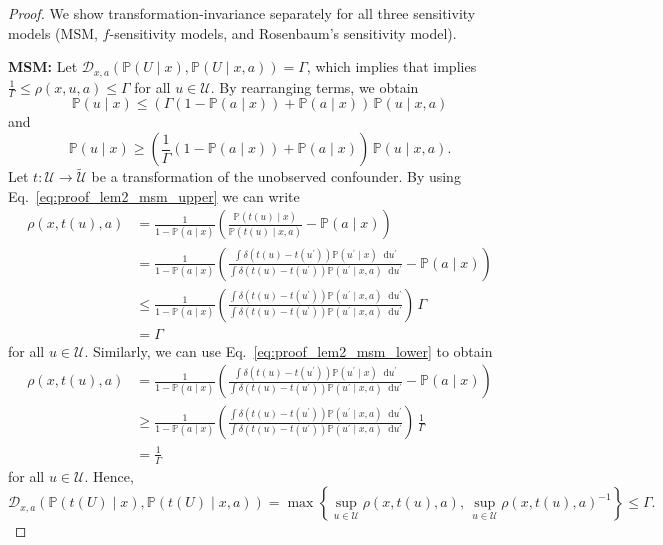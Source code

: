 \documentclass{article} %
\newcommand*\diff{\mathop{}\!\mathrm{d}}
\theoremstyle{definition}
\theoremstyle{plain}
\begin{document}
\begin{proof}
We show transformation-invariance separately for all three sensitivity models (MSM, $f$-sensitivity models, and Rosenbaum's sensitivity model).

\textbf{MSM:} Let $\mathcal{D}_{x, a}(\mathbb{P}(U \mid x), \mathbb{P}(U \mid x, a)) = \Gamma$, which implies that implies $\frac{1}{\Gamma} \leq \rho(x, u, a) \leq \Gamma$ for all $u \in \mathcal{U}$. By rearranging terms, we obtain
\begin{equation}\label{eq:proof_lem2_msm_upper}
\mathbb{P}(u \mid x)  \leq \left( \Gamma (1 - \mathbb{P}(a \mid x)) + \mathbb{P}(a \mid x) \right) \, \mathbb{P}(u \mid x, a)
\end{equation}
and
\begin{equation}\label{eq:proof_lem2_msm_lower}
\mathbb{P}(u \mid x)  \geq \left( \frac{1}{\Gamma} (1 - \mathbb{P}(a \mid x)) + \mathbb{P}(a \mid x) \right) \, \mathbb{P}(u \mid x, a).
\end{equation}
Let $t \colon \mathcal{U} \to \widetilde{\mathcal{U}}$ be a transformation of the unobserved confounder. By using Eq.~\eqref{eq:proof_lem2_msm_upper} we can write
\begin{align}
\rho(x, t(u), a) &=\frac{1}{1 - \mathbb{P}(a \mid x)} \left(\frac{\mathbb{P}(t(u) \mid x)}{\mathbb{P}(t(u) \mid x, a)} - \mathbb{P}(a \mid x) \right) \\
&= \frac{1}{1 - \mathbb{P}(a \mid x)} \left(\frac{ \int \delta(t(u) - t(u^\prime))\mathbb{P}(u^\prime \mid x) \diff u^\prime}{\int \delta(t(u) - t(u^\prime))\mathbb{P}(u^\prime \mid x, a) \diff u^\prime} - \mathbb{P}(a \mid x) \right) \\
& \leq \frac{1}{1 - \mathbb{P}(a \mid x)} \left(\frac{ \int \delta(t(u) - t(u^\prime))\mathbb{P}(u^\prime \mid x, a) \diff u^\prime}{\int \delta(t(u) - t(u^\prime))\mathbb{P}(u^\prime \mid x, a) \diff u^\prime} \right) 
 \, \Gamma \\
&= \Gamma
\end{align}
for all $u \in \mathcal{U}$. Similarly, we can use Eq.~\eqref{eq:proof_lem2_msm_lower} to obtain
\begin{align}
\rho(x, t(u), a)
&= \frac{1}{1 - \mathbb{P}(a \mid x)} \left(\frac{ \int \delta(t(u) - t(u^\prime))\mathbb{P}(u^\prime \mid x) \diff u^\prime}{\int \delta(t(u) - t(u^\prime))\mathbb{P}(u^\prime \mid x, a) \diff u^\prime} - \mathbb{P}(a \mid x) \right) \\
& \geq \frac{1}{1 - \mathbb{P}(a \mid x)} \left(\frac{ \int \delta(t(u) - t(u^\prime))\mathbb{P}(u^\prime \mid x, a) \diff u^\prime}{\int \delta(t(u) - t(u^\prime))\mathbb{P}(u^\prime \mid x, a) \diff u^\prime} \right) 
 \, \frac{1}{\Gamma} \\
&= \frac{1}{\Gamma}
\end{align}
for all $u \in \mathcal{U}$. Hence, 
\begin{equation}
\mathcal{D}_{x,a}(\mathbb{P}(t(U) \mid x), \mathbb{P}(t(U) \mid x, a)) = \max\left\{\sup_{u \in \mathcal{U}} \rho(x, t(u), a), \, \sup_{u \in \mathcal{U}} \rho(x, t(u), a)^{-1} \right\} \leq \Gamma.
\end{equation}


\end{proof}
\end{document}
